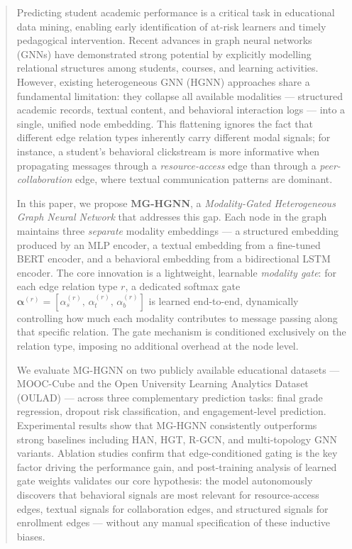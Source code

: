 \documentclass[sigconf]{acmart}
\begin{document}
\begin{abstract}
Predicting student academic performance is a critical task in educational data
mining, enabling early identification of at-risk learners and timely pedagogical
intervention. Recent advances in graph neural networks (GNNs) have demonstrated
strong potential by explicitly modelling relational structures among students,
courses, and learning activities. However, existing heterogeneous GNN (HGNN)
approaches share a fundamental limitation: they collapse all available modalities
--- structured academic records, textual content, and behavioral interaction logs
--- into a single, unified node embedding. This flattening ignores the fact that
different edge relation types inherently carry different modal signals; for
instance, a student's behavioral clickstream is more informative when propagating
messages through a \emph{resource-access} edge than through a
\emph{peer-collaboration} edge, where textual communication patterns are
dominant.

In this paper, we propose \textbf{MG-HGNN}, a \textit{Modality-Gated
Heterogeneous Graph Neural Network} that addresses this gap. Each node in the
graph maintains three \emph{separate} modality embeddings --- a structured
embedding produced by an MLP encoder, a textual embedding from a fine-tuned BERT
encoder, and a behavioral embedding from a bidirectional LSTM encoder. The core
innovation is a lightweight, learnable \emph{modality gate}: for each edge
relation type $r$, a dedicated softmax gate $\boldsymbol{\alpha}^{(r)} =
[\alpha_s^{(r)},\, \alpha_t^{(r)},\, \alpha_b^{(r)}]$ is learned end-to-end,
dynamically controlling how much each modality contributes to message passing
along that specific relation. The gate mechanism is conditioned exclusively on
the relation type, imposing no additional overhead at the node level.

We evaluate MG-HGNN on two publicly available educational datasets --- MOOC-Cube
and the Open University Learning Analytics Dataset (OULAD) --- across three
complementary prediction tasks: final grade regression, dropout risk
classification, and engagement-level prediction. Experimental results show that
MG-HGNN consistently outperforms strong baselines including HAN, HGT, R-GCN,
and multi-topology GNN variants. Ablation studies confirm that edge-conditioned
gating is the key factor driving the performance gain, and post-training
analysis of learned gate weights validates our core hypothesis: the model
autonomously discovers that behavioral signals are most relevant for
resource-access edges, textual signals for collaboration edges, and structured
signals for enrollment edges --- without any manual specification of these
inductive biases.
\end{abstract}
\end{document}
